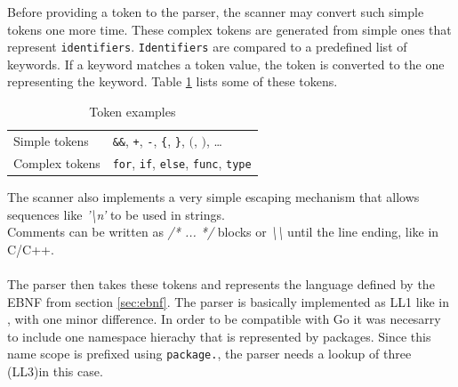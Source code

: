 \documentclass[a4paper]{scrartcl}
\begin{document}
    Before providing a token to the parser, the scanner may convert such 
    simple tokens one more time. These complex tokens are generated from simple
    ones that represent \texttt{identifiers}. \texttt{Identifiers} are compared to a 
    predefined list of keywords. If a keyword matches a token value, the token
    is converted to the one representing the keyword. Table \ref{tbl:tokens} 
    lists some of these tokens.

    \begin{table}[htb]
    \centering
    \begin{tabular}{ll}
        \toprule
        Simple tokens & \texttt{\&\&}, \texttt{+}, \texttt{-}, \texttt{\{}, \texttt{\}}, \texttt{$($}, \texttt{$)$}, \dots \\
        Complex tokens & \texttt{for}, \texttt{if}, \texttt{else}, \texttt{func}, \texttt{type} \\
        \bottomrule
    \end{tabular}
    \caption{Token examples}
    \label{tbl:tokens}
    \end{table}

    The scanner also implements a very simple escaping mechanism that allows 
    sequences like \textit{'\textbackslash n'} to be used in strings. \\
    Comments can be written as \textit{/* ... */} blocks or 
    \textit{\textbackslash \textbackslash} until the line ending, like in C/C++.
    \\ \\
    The parser then takes these tokens and represents the language defined by
    the EBNF from section \ref{sec:ebnf}. The parser is basically implemented 
    as LL1 like in \cite{wir96}, with one minor difference. In order to be 
    compatible with Go it was necesarry to include one namespace hierachy that 
    is represented by packages. Since this name scope is prefixed 
    using \texttt{package.}, the parser needs a lookup of three (LL3)in this 
    case.
\end{document}
